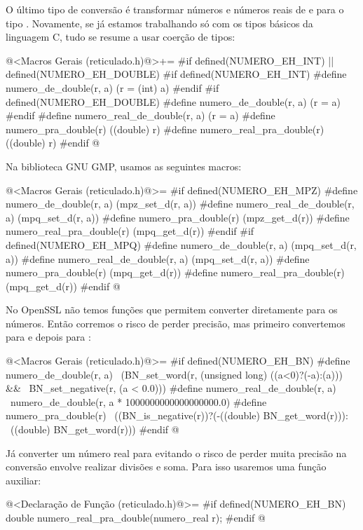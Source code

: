 O último tipo de conversão é transformar números e números reais de e
para o tipo . Novamente, se já estamos trabalhando
só com os tipos básicos da linguagem C, tudo se resume a usar coerção
de tipos:

\iniciocodigo
@<Macros Gerais (reticulado.h)@>+=
#if defined(NUMERO_EH_INT) || defined(NUMERO_EH_DOUBLE)
#if defined(NUMERO_EH_INT)
#define numero_de_double(r, a) (r = (int) a)
#endif
#if defined(NUMERO_EH_DOUBLE)
#define numero_de_double(r, a) (r = a)
#endif
#define numero_real_de_double(r, a) (r = a)
#define numero_pra_double(r) ((double) r)
#define numero_real_pra_double(r) ((double) r)
#endif
@
\fimcodigo

Na biblioteca GNU GMP, usamos as seguintes macros:


\iniciocodigo
@<Macros Gerais (reticulado.h)@>=
#if defined(NUMERO_EH_MPZ)
#define numero_de_double(r, a) (mpz_set_d(r, a))
#define numero_real_de_double(r, a) (mpq_set_d(r, a))
#define numero_pra_double(r) (mpz_get_d(r))
#define numero_real_pra_double(r) (mpq_get_d(r))
#endif
#if defined(NUMERO_EH_MPQ)
#define numero_de_double(r, a) (mpq_set_d(r, a))
#define numero_real_de_double(r, a) (mpq_set_d(r, a))
#define numero_pra_double(r) (mpq_get_d(r))
#define numero_real_pra_double(r) (mpq_get_d(r))
#endif
@
\fimcodigo

No OpenSSL não temos funções que permitem converter diretamente
para  os números. Então corremos o risco de perder
precisão, mas primeiro convertemos para  e depois
para :

\iniciocodigo
@<Macros Gerais (reticulado.h)@>=
#if defined(NUMERO_EH_BN)
#define numero_de_double(r, a)                                      \
              (BN_set_word(r, (unsigned long) ((a<0)?(-a):(a))) &&  \
               BN_set_negative(r, (a < 0.0)))
#define numero_real_de_double(r, a)                                 \
              numero_de_double(r, a * 1000000000000000000.0)
#define numero_pra_double(r)                                        \
              ((BN_is_negative(r))?(-((double) BN_get_word(r))):    \
                                   ((double) BN_get_word(r)))
#endif
@
\fimcodigo

Já converter um número real para \monoespaco{double} evitando o risco
de perder muita precisão na conversão envolve realizar divisões e
soma. Para isso usaremos uma função auxiliar:

\iniciocodigo
@<Declaração de Função (reticulado.h)@>=
#if defined(NUMERO_EH_BN)
double numero_real_pra_double(numero_real r);
#endif
@
\fimcodigo

